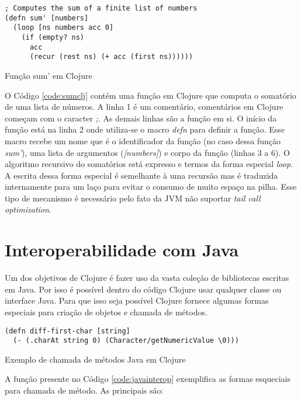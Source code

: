 \begin{listing}
  \begin{verbatim}
; Computes the sum of a finite list of numbers
(defn sum' [numbers]
  (loop [ns numbers acc 0]
    (if (empty? ns)
      acc
      (recur (rest ns) (+ acc (first ns))))))
  \end{verbatim}
  \caption{Função sum' em Clojure}
  \label{code:sumclj}
\end{listing}

O Código \ref{code:sumclj} contém uma função em Clojure que computa o somatório de uma lista de números. A linha 1 é um comentário, comentários em Clojure começam com o caracter \emph{;}. As demais linhas são a função em si. O início da função está na linha 2 onde utiliza-se o macro \emph{defn} para definir a função. Esse macro recebe um nome que é o identificador da função (no caso dessa função \emph{sum’}), uma lista de argumentos (\emph{[numbers]}) e corpo da função (linhas 3 a 6). O algoritmo recursivo do somatórios está expresso e termos da forma especial \emph{loop}. A escrita dessa forma especial é semelhante à uma recursão mas é traduzida internamente para um laço para evitar o consumo de muito espaço na pilha. Esse tipo de mecanismo é necessário pelo fato da JVM não suportar \emph{tail call optimization}.


\section{Interoperabilidade com Java}

Um dos objetivos de Clojure é fazer uso da vasta coleção de bibliotecas escritas em Java. Por isso é possível dentro do código Clojure usar qualquer classe ou interface Java. Para que isso seja possível Clojure fornece algumas formas especiais para criação de objetos e chamada de métodos.

\begin{listing}
  \begin{verbatim}
(defn diff-first-char [string]
  (- (.charAt string 0) (Character/getNumericValue \0)))
  \end{verbatim}
  \caption{Exemplo de chamada de métodos Java em Clojure}
  \label{code:javainterop}
\end{listing}

A função presente no Código \ref{code:javainterop} exemplifica as formas esqueciais para chamada de método. As principais são:

